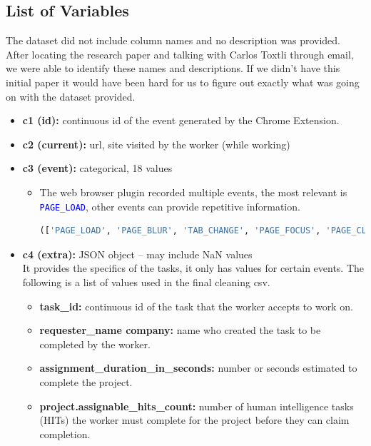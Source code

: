 \documentclass[11pt]{article}
\newcommand{\codeword}[1]{\texttt{\textcolor{blue}{#1}}}
\begin{document}
\subsection{List of Variables}
The dataset did not include column names and no description was provided. After locating the research paper and talking with Carlos Toxtli through email, we were able to identify these names and descriptions. If we didn't have this initial paper it would have been hard for us to figure out exactly what was going on with the dataset provided.
\begin{itemize}
    \item \textbf{c1 (id):} continuous id of the event generated by the Chrome Extension. \cite{toloka-web-extension-github}
    \item \textbf{c2 (current):}  url, site visited by the worker (while working)
    \item \textbf{c3 (event):} categorical, 18 values
    \begin{itemize}
        \item The web browser plugin recorded multiple events, the most relevant is \codeword{PAGE\_LOAD}, other events can provide repetitive information.
        \begin{lstlisting}[language=Python, caption=Chrome Plugin: 'events' value.]
(['PAGE_LOAD', 'PAGE_BLUR', 'TAB_CHANGE', 'PAGE_FOCUS', 'PAGE_CLICK', 'PAGE_SCROLL', 'PAGE_LAST', 'PAGE_CLOSE', 'INTERNALURL', 'PAGE_KEY', 'PAGE_INACTIVITY', 'TAB_CLOSED', 'EXTERNALURL', 'PAGE_REACTIVATE', 'SYSTEM_DISABLED_WORKING', 'SYSTEM_ENABLED_WORKING', 'SYSTEM_ENABLED', 'SYSTEM_DISABLED'])
\end{lstlisting}
    \end{itemize}
    \item \textbf{c4 (extra):} JSON object – may include NaN values
    \\ It provides the specifics of the tasks, it only has values for certain events. The following is a list of values used in the final cleaning csv.
    \begin{itemize}
        \item \textbf{task\_id:} continuous id of the task that the worker accepts to work on.
        \item \textbf{requester\_name company:} name who created the task to be completed by the worker.
        \item \textbf{assignment\_duration\_in\_seconds:} number or seconds estimated to complete the project.
        \item \textbf{project.assignable\_hits\_count:} number of human intelligence tasks (HITs) the worker must complete for the project before they can claim completion.

\end{itemize}
\end{itemize}
\end{document}
